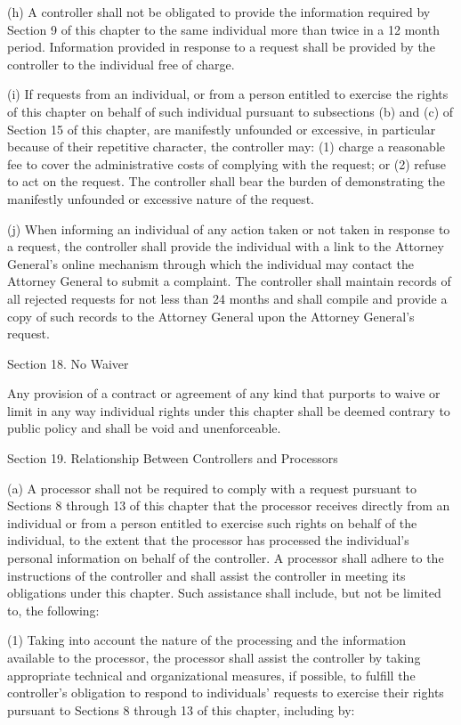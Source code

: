 (h) A controller shall not be obligated to provide the information required by Section 9 of this chapter to the same individual more than twice in a 12 month period. Information provided in response to a request shall be provided by the controller to the individual free of charge.

(i) If requests from an individual, or from a person entitled to exercise the rights of this chapter on behalf of such individual pursuant to subsections (b) and (c) of Section 15 of this chapter, are manifestly unfounded or excessive, in particular because of their repetitive character, the controller may: (1) charge a reasonable fee to cover the administrative costs of complying with the request; or (2) refuse to act on the request. The controller shall bear the burden of demonstrating the manifestly unfounded or excessive nature of the request.

(j) When informing an individual of any action taken or not taken in response to a request, the controller shall provide the individual with a link to the Attorney General’s online mechanism through which the individual may contact the Attorney General to submit a complaint. The controller shall maintain records of all rejected requests for not less than 24 months and shall compile and provide a copy of such records to the Attorney General upon the Attorney General’s request. 

Section 18. No Waiver

Any provision of a contract or agreement of any kind that purports to waive or limit in any way individual rights under this chapter shall be deemed contrary to public policy and shall be void and unenforceable.

Section 19. Relationship Between Controllers and Processors 

(a) A processor shall not be required to comply with a request pursuant to Sections 8 through 13 of this chapter that the processor receives directly from an individual or from a person entitled to exercise such rights on behalf of the individual, to the extent that the processor has processed the individual’s personal information on behalf of the controller. A processor shall adhere to the instructions of the controller and shall assist the controller in meeting its obligations under this chapter. Such assistance shall include, but not be limited to, the following:

(1) Taking into account the nature of the processing and the information available to the processor, the processor shall assist the controller by taking appropriate technical and organizational measures, if possible, to fulfill the controller’s obligation to respond to individuals’ requests to exercise their rights pursuant to Sections 8 through 13 of this chapter, including by:

